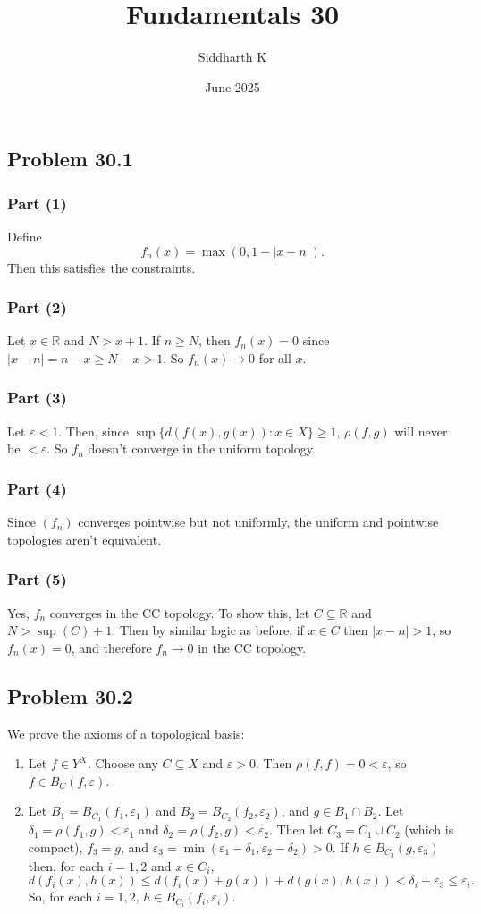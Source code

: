 \documentclass{article}
\title{Fundamentals 30}
\author{Siddharth K}
\date{June 2025}
\newcommand{\R}{\mathbb{R}}
\newcommand{\eps}{\varepsilon}
\begin{document}
\maketitle

\subsection*{Problem 30.1}
\subsubsection*{Part (1)}
Define
$$f_n(x) = \max(0, 1 - |x - n|).$$
Then this satisfies the constraints.

\subsubsection*{Part (2)}
Let $x \in \R$ and $N > x + 1$. If $n \ge N$, then $f_n(x) = 0$ since $|x - n| = n - x \ge N - x > 1$. So $f_n(x) \to 0$ for all $x$.

\subsubsection*{Part (3)}
Let $\eps < 1$. Then, since $\sup\{d(f(x), g(x)): x \in X\} \ge 1$, $\rho(f, g)$ will never be $< \eps$. So $f_n$ doesn't converge in the uniform topology.

\subsubsection*{Part (4)}
Since $(f_n)$ converges pointwise but not uniformly, the uniform and pointwise topologies aren't equivalent.

\subsubsection*{Part (5)}
Yes, $f_n$ converges in the CC topology. To show this, let $C \subseteq \R$ and $N > \sup(C) + 1$. Then by similar logic as before, if $x \in C$ then $|x - n| > 1$, so $f_n(x) = 0$, and therefore $f_n \to 0$ in the CC topology.

\subsection*{Problem 30.2}
We prove the axioms of a topological basis:
\begin{enumerate}
    \item Let $f \in Y^X$. Choose any $C \subseteq X$ and $\eps > 0$. Then $\rho(f, f) = 0 < \eps$, so $f \in B_C(f, \eps)$.
    \item Let $B_1 = B_{C_1}(f_1, \eps_1)$ and $B_2 = B_{C_2}(f_2, \eps_2)$, and $g \in B_1 \cap B_2$. Let $\delta_1 = \rho(f_1, g) < \eps_1$ and $\delta_2 = \rho(f_2, g) < \eps_2$. Then let $C_3 = C_1 \cup C_2$ (which is compact), $f_3 = g$, and $\eps_3 = \min(\eps_1 - \delta_1, \eps_2 - \delta_2) > 0$. If $h \in B_{C_3}(g, \eps_3)$ then, for each $i = 1, 2$ and $x \in C_i$,
    $$d(f_i(x), h(x)) \le d(f_i(x) + g(x)) + d(g(x), h(x)) < \delta_i + \eps_3 \le \eps_i.$$
    So, for each $i = 1,2$, $h \in B_{C_i}(f_i, \eps_i)$.
\end{enumerate}
\end{document}
